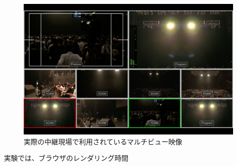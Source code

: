 \begin{figure}[htbp]
  \begin{center}
    \includegraphics[bb=0 0 1680 1050,width=14cm]{img/mv-delay-actual.png}
  \end{center}
  \caption{実際の中継現場で利用されているマルチビュー映像}
  \label{fig:mv-delay-actual}
\end{figure}

実験では、ブラウザのレンダリング時間

